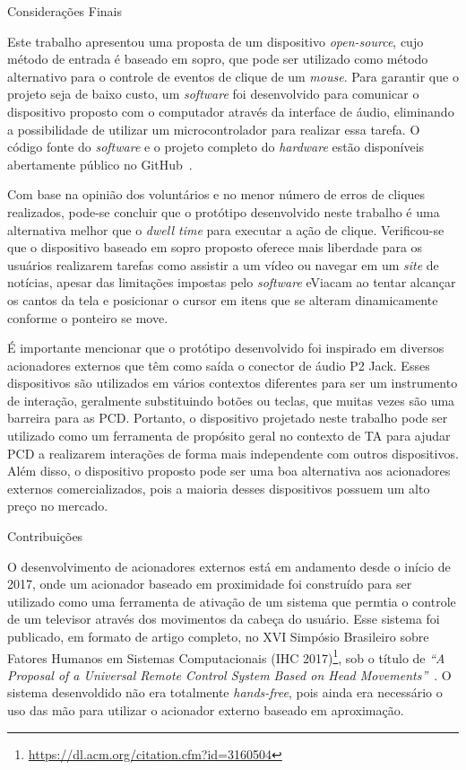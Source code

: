 \begin{chapter}{Considerações Finais}

Este trabalho apresentou uma proposta de um dispositivo \textit{open-source},
cujo método de entrada é baseado em sopro, que pode ser utilizado como método
alternativo para o controle de eventos de clique de um \textit{mouse}. Para
garantir que o projeto seja de baixo custo, um \textit{software} foi desenvolvido
para comunicar o dispositivo proposto com o computador através da interface de
áudio, eliminando a possibilidade de utilizar um microcontrolador para realizar
essa tarefa. O código fonte do \textit{software} e o projeto completo do
\textit{hardware} estão disponíveis abertamente público no 
GitHub~\cite{ErickGit}.

Com base na opinião dos voluntários e no menor número de erros de cliques
realizados, pode-se concluir que o protótipo desenvolvido neste trabalho é uma
alternativa melhor que o \textit{dwell time} para executar a ação
de clique. Verificou-se que o dispositivo baseado em sopro proposto oferece mais
liberdade para os usuários realizarem tarefas como assistir a um vídeo ou
navegar em um \textit{site} de notícias, apesar das limitações impostas pelo
\textit{software} eViacam ao tentar alcançar os cantos da tela e posicionar o
cursor em itens que se alteram dinamicamente conforme o ponteiro se move.

É importante mencionar que o protótipo desenvolvido foi inspirado em diversos
acionadores externos que têm como saída o conector de áudio P2 Jack. Esses
dispositivos são utilizados em vários contextos diferentes para ser um
instrumento de interação, geralmente substituindo botões ou teclas, que muitas
vezes são uma barreira para as PCD. Portanto, o dispositivo projetado neste
trabalho pode ser utilizado como um ferramenta de propósito geral no contexto de
TA para ajudar PCD a realizarem interações de forma mais
independente com outros dispositivos. Além disso, o dispositivo proposto pode
ser uma boa alternativa aos acionadores externos comercializados, pois a maioria
desses dispositivos possuem um alto preço no mercado.

\begin{section}{Contribuições}

O desenvolvimento de acionadores externos está em andamento desde o início de 2017,
onde um acionador baseado em proximidade foi construído para ser utilizado como
uma ferramenta de ativação de um sistema que permtia o controle de um televisor
através dos movimentos da cabeça do usuário. Esse sistema foi publicado, em
formato de artigo completo, no XVI Simpósio Brasileiro sobre Fatores Humanos em
Sistemas Computacionais (IHC
2017)\footnote{\url{https://dl.acm.org/citation.cfm?id=3160504}}, sob o
título de \textit{``A Proposal  of a Universal Remote Control System Based on Head
Movements''}~\cite{Erick17}. O sistema desenvoldido não era totalmente
\textit{hands-free}, pois ainda era necessário o uso das mão para utilizar o
acionador externo baseado em aproximação.


\end{section}
\end{chapter}
